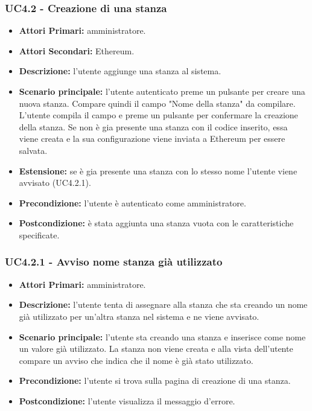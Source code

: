 \subsubsection{ UC4.2 - Creazione di una stanza}
\begin{itemize}
	\item\textbf{Attori Primari:}
	amministratore.
	\item\textbf{Attori Secondari:}
	Ethereum.
	\item\textbf{Descrizione:} 
	l'utente aggiunge una stanza al sistema.
	\item\textbf{Scenario principale:} 
	l'utente autenticato preme un pulsante per creare una nuova stanza. Compare quindi il campo "Nome della stanza" da compilare.
	L'utente compila il campo e preme un pulsante per confermare la creazione della stanza.
	Se non è gia presente una stanza con il codice inserito, essa viene creata e la sua configurazione viene inviata a Ethereum per essere salvata.
	\item\textbf{Estensione:}
	se è gia presente una stanza con lo stesso nome l'utente viene avvisato (UC4.2.1).
	\item\textbf{Precondizione:} 
	l'utente è autenticato come amministratore.
	\item\textbf{Postcondizione:}
	è stata aggiunta una stanza vuota con le caratteristiche specificate.
\end{itemize}

\subsubsection{ UC4.2.1 - Avviso nome stanza già utilizzato}
\begin{itemize}
	\item\textbf{Attori Primari:}
	amministratore.
	\item\textbf{Descrizione:}
	l'utente tenta di assegnare alla stanza che sta creando un nome già utilizzato per un'altra stanza nel sistema e ne viene avvisato.
	\item\textbf{Scenario principale:}
	l'utente sta creando una stanza e inserisce come nome un valore già utilizzato.
	La stanza non viene creata e alla vista dell'utente compare un avviso che indica che il nome è già stato utilizzato.
	\item\textbf{Precondizione:}
	l'utente si trova sulla pagina di creazione di una stanza.
	\item\textbf{Postcondizione:}
	l'utente visualizza il messaggio d'errore.
\end{itemize}


